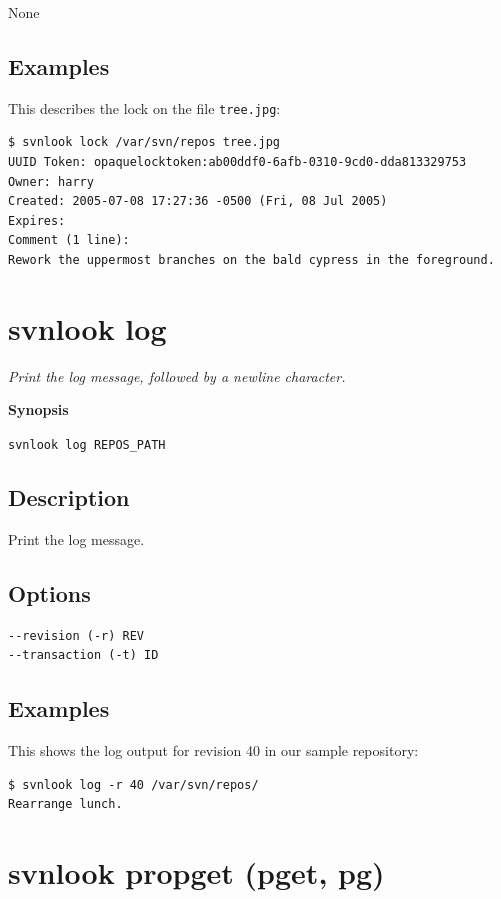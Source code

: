None

\subsection{Examples}

This describes the lock on the file \texttt{tree.jpg}:

\begin{verbatim}
$ svnlook lock /var/svn/repos tree.jpg
UUID Token: opaquelocktoken:ab00ddf0-6afb-0310-9cd0-dda813329753
Owner: harry
Created: 2005-07-08 17:27:36 -0500 (Fri, 08 Jul 2005)
Expires: 
Comment (1 line):
Rework the uppermost branches on the bald cypress in the foreground.
\end{verbatim}

\section{svnlook log}\label{svn.ref.svnlook.c.log}

\emph{Print the log message, followed by a newline character.}

\textbf{Synopsis}

\texttt{svnlook\ log\ REPOS\_PATH}

\subsection{Description}

Print the log message.

\subsection{Options}

\begin{verbatim}
--revision (-r) REV
--transaction (-t) ID
\end{verbatim}

\subsection{Examples}

This shows the log output for revision 40 in our sample repository:

\begin{verbatim}
$ svnlook log -r 40 /var/svn/repos/
Rearrange lunch.
\end{verbatim}

\section{svnlook propget (pget, pg)}\label{svn.ref.svnlook.c.propget}

